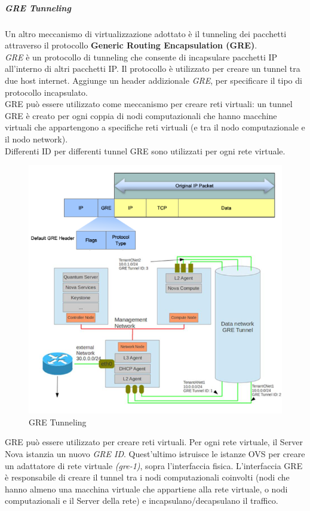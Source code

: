 \documentclass{article}
\begin{document}
\subparagraph{GRE Tunneling}
Un altro meccanismo di virtualizzazione adottato è il tunneling dei pacchetti attraverso il protocollo \textbf{Generic Routing Encapsulation (GRE)}. \\
\textit{GRE} è un protocollo di tunneling che consente di incapsulare pacchetti IP all'interno di altri pacchetti IP. Il protocollo è utilizzato per creare un tunnel tra due host internet. Aggiunge un header addizionale \textit{GRE}, per specificare il tipo di protocollo incapsulato. \\
GRE può essere utilizzato come meccanismo per creare reti virtuali: un tunnel GRE è creato per ogni coppia di nodi computazionali che hanno macchine virtuali che appartengono a specifiche reti virtuali (e tra il nodo computazionale e il nodo network). \\
Differenti ID per differenti tunnel GRE sono utilizzati per ogni rete virtuale. 
\begin{figure}[H]
    \centering
    \includegraphics[scale=0.4]{img/GRE tunneling.png}
    \caption{GRE Tunneling}
\end{figure}\noindent
GRE può essere utilizzato per creare reti virtuali. Per ogni rete virtuale, il Server Nova istanzia un nuovo \textit{GRE ID}. Quest'ultimo istruisce le istanze OVS per creare un adattatore di rete virtuale \textit{(gre-1)}, sopra l'interfaccia fisica. L'interfaccia GRE è responsabile di creare il tunnel tra i nodi computazionali coinvolti (nodi che hanno almeno una macchina virtuale che appartiene alla rete virtuale, o nodi computazionali e il Server della rete) e incapsulano/decapsulano il traffico.
\end{document}
